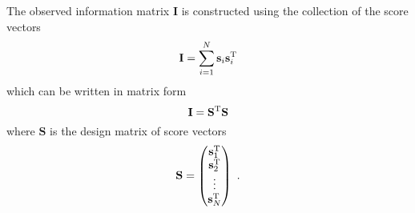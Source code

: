 \documentclass{article}
\newcommand{\T}{^\textup{T}}
\begin{document}
The observed information matrix $\mathbf{I}$ is constructed using the collection of the score vectors
\begin{equation}
    \mathbf{I} = \sum_{i=1}^N \mathbf{s}_i \mathbf{s}_i\T
\end{equation}
which can be written in matrix form
\begin{equation}
    \mathbf{I} = \mathbf{S}\T \mathbf{S}
\end{equation}
where $\mathbf{S}$ is the design matrix of score vectors
\begin{equation}
    \mathbf{S} =
    \begin{pmatrix}
      \mathbf{s}_1\T \\
      \mathbf{s}_2\T \\
      \vdots \\
      \mathbf{s}_N\T
    \end{pmatrix}
    \ .
\end{equation}
\end{document}
